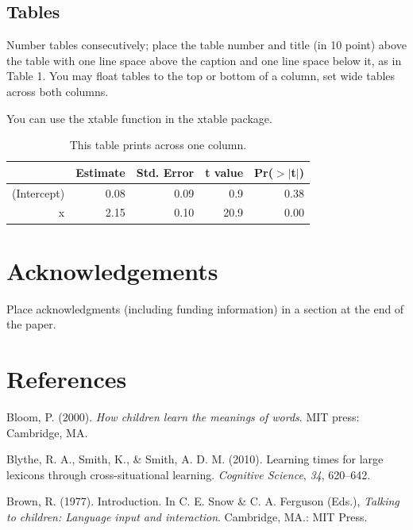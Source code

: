 \documentclass[10pt, letterpaper]{article}
\begin{document}
\subsection{Tables}\label{tables}

Number tables consecutively; place the table number and title (in 10
point) above the table with one line space above the caption and one
line space below it, as in Table 1. You may float tables to the top or
bottom of a column, set wide tables across both columns.

You can use the xtable function in the xtable package.

\begin{table}[H]
\centering
\begin{tabular}{rrrrr}
  \hline
 & Estimate & Std. Error & t value & Pr($>$$|$t$|$) \\ 
  \hline
(Intercept) & 0.08 & 0.09 & 0.9 & 0.38 \\ 
  x & 2.15 & 0.10 & 20.9 & 0.00 \\ 
   \hline
\end{tabular}
\caption{This table prints across one column.} 
\end{table}

\section{Acknowledgements}\label{acknowledgements}

Place acknowledgments (including funding information) in a section at
the end of the paper.

\section{References}\label{references}

\setlength{\parindent}{-0.1in} \setlength{\leftskip}{0.125in} \noindent

\hypertarget{refs}{}
\hypertarget{ref-bloom2000}{}
Bloom, P. (2000). \emph{How children learn the meanings of words}. MIT
press: Cambridge, MA.

\hypertarget{ref-blythe2010}{}
Blythe, R. A., Smith, K., \& Smith, A. D. M. (2010). Learning times for
large lexicons through cross-situational learning. \emph{Cognitive
Science}, \emph{34}, 620--642.

\hypertarget{ref-brown1977}{}
Brown, R. (1977). Introduction. In C. E. Snow \& C. A. Ferguson (Eds.),
\emph{Talking to children: Language input and interaction}. Cambridge,
MA.: MIT Press.
\end{document}
